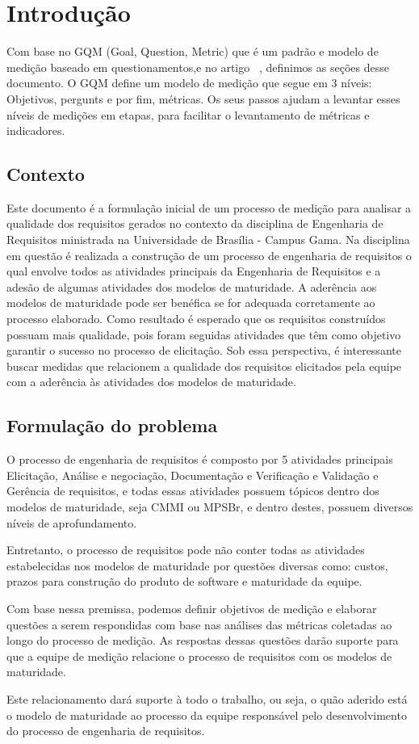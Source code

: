 \chapter{Introdução}

Com base no GQM (Goal, Question, Metric) que é um padrão e modelo de medição baseado em questionamentos,e no artigo ~\cite{borges2003modelo}, definimos as seções desse documento. O GQM define um modelo de medição que segue em 3 níveis: Objetivos, pergunts e por fim, métricas. Os seus passos ajudam a levantar esses níveis de medições em etapas, para facilitar o levantamento de métricas e indicadores.

\section{Contexto}

Este documento é a formulação inicial de um processo de medição para analisar a qualidade dos requisitos gerados no contexto da disciplina de Engenharia de Requisitos ministrada na Universidade de Brasília - Campus Gama. 
Na disciplina em questão é realizada a construção de um processo de engenharia de requisitos o qual envolve todos as atividades principais da Engenharia de Requisitos e a adesão de algumas atividades dos modelos de maturidade. A aderência aos modelos de maturidade pode ser benéfica se for adequada corretamente ao processo elaborado. 
Como resultado é esperado que os requisitos construídos possuam mais qualidade, pois foram seguidas atividades que têm como objetivo garantir o sucesso no processo de elicitação.
Sob essa perspectiva, é interessante buscar medidas que relacionem a qualidade dos requisitos elicitados pela equipe com a aderência às atividades dos modelos de maturidade.

\section{Formulação do problema}

O processo de engenharia de requisitos é composto por 5 atividades principais Elicitação, Análise e negociação, Documentação e Verificação e Validação e Gerência de requisitos, e todas essas atividades possuem tópicos dentro dos modelos de maturidade, seja CMMI ou MPSBr, e dentro destes, possuem diversos níveis de aprofundamento.
	
Entretanto, o processo de requisitos pode não conter todas as atividades estabelecidas nos modelos de maturidade por questões diversas como: custos, prazos para construção do produto de software e maturidade da equipe. 

Com base nessa premissa, podemos definir objetivos de medição e elaborar questões a serem respondidas com base nas análises das métricas coletadas ao longo do processo de medição. As respostas dessas questões darão suporte para que a equipe de medição relacione o processo de requisitos com os modelos de maturidade.

Este relacionamento dará suporte à todo o trabalho, ou seja, o quão aderido está o modelo de maturidade ao processo da equipe responsável pelo desenvolvimento do processo de engenharia de requisitos.
 
